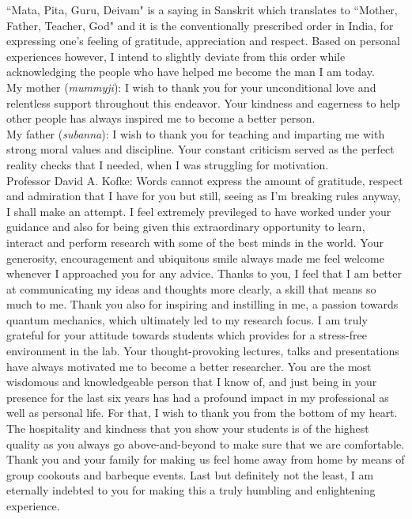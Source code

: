 ``Mata, Pita, Guru, Deivam" is a saying in Sanskrit which translates to ``Mother, Father, Teacher, God" and it is the conventionally prescribed order in India, for expressing one's feeling of gratitude, appreciation and respect. Based on personal experiences however, I intend to slightly deviate from this order while acknowledging the people who have helped me become the man I am today.\\

\noindent My mother (\emph{mummyji}): I wish to thank you for your unconditional love and relentless support throughout this endeavor. Your kindness and eagerness to help other people has always inspired me to become a better person.\\

\noindent My father (\emph{subanna}): I wish to thank you for teaching and imparting me with strong moral values and discipline. Your constant criticism served as the perfect reality checks that I needed, when I was struggling for motivation.\\

\noindent Professor David A. Kofke: Words cannot express the amount of gratitude, respect and admiration that I have for you but still, seeing as I'm breaking rules anyway, I shall make an attempt. I feel extremely previleged to have worked under your guidance and also for being given this extraordinary opportunity to learn, interact and perform research with some of the best minds in the world. Your generosity, encouragement and ubiquitous smile always made me feel welcome whenever I approached you for any advice. Thanks to you, I feel that I am better at communicating my ideas and thoughts more clearly, a skill that means so much to me. Thank you also for inspiring and instilling in me, a passion towards quantum mechanics, which ultimately led to my research focus. I am truly grateful for your attitude towards students which provides for a stress-free environment in the lab. Your thought-provoking lectures, talks and presentations have always motivated me to become a better researcher. You are the most wisdomous and knowledgeable person that I know of, and just being in your presence for the last six years has had a profound impact in my professional as well as personal life. For that, I wish to thank you from the bottom of my heart. The hospitality and kindness that you show your students is of the highest quality as you always go above-and-beyond to make sure that we are comfortable. Thank you and your family for making us feel home away from home by means of group cookouts and barbeque events. Last but definitely not the least, I am eternally indebted to you for making this a truly humbling and enlightening experience.\\

